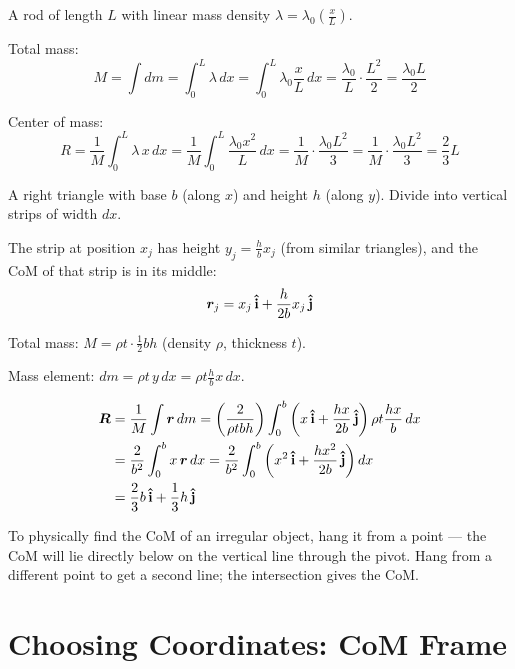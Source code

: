 \begin{example}
A rod of length $L$ with linear mass density $\lambda = \lambda_0\!\left(\frac{x}{L}\right)$.

Total mass:
\[
    M = \int dm = \int_0^L \lambda\,dx = \int_0^L \lambda_0\frac{x}{L}\,dx = \frac{\lambda_0}{L}\cdot\frac{L^2}{2} = \frac{\lambda_0 L}{2}
\]

Center of mass:
\[
    R = \frac{1}{M}\int_0^L \lambda\,x\,dx = \frac{1}{M}\int_0^L \frac{\lambda_0 x^2}{L}\,dx = \frac{1}{M}\cdot\frac{\lambda_0 L^2}{3} = \frac{1}{M}\cdot\frac{\lambda_0 L^2}{3} = \frac{2}{3}L
\]
\end{example}

\begin{example}
A right triangle with base $b$ (along $x$) and height $h$ (along $y$). Divide into vertical strips of width $dx$.

The strip at position $x_j$ has height $y_j = \frac{h}{b}x_j$ (from similar triangles), and the CoM of that strip is in its middle:
\[
    \bm{r}_j = x_j\,\boldsymbol{\hat{\textbf{i}}} + \frac{h}{2b}x_j\,\boldsymbol{\hat{\textbf{j}}}
\]

Total mass: $M = \rho t \cdot \frac{1}{2}bh$ (density $\rho$, thickness $t$).

Mass element: $dm = \rho t\,y\,dx = \rho t\frac{h}{b}x\,dx$.

\begin{align*}
    \vect{R} &= \frac{1}{M}\int \lvect{r}\,dm = \left(\frac{2}{\rho t b h}\right)\int_0^b \left(x\,\ihat + \frac{hx}{2b}\,\jhat\right)\rho t\frac{hx}{b}\,dx \\
    &= \frac{2}{b^2}\int_0^b x\,\lvect{r}\,dx = \frac{2}{b^2}\int_0^b \left(x^2\,\ihat + \frac{hx^2}{2b}\,\jhat\right)dx \\
    &= \frac{2}{3}b\,\ihat + \frac{1}{3}h\,\jhat
\end{align*}
\end{example}

\begin{fact}
To physically find the CoM of an irregular object, hang it from a point — the CoM will lie directly below on the vertical line through the pivot. Hang from a different point to get a second line; the intersection gives the CoM.
\end{fact}

\section{Choosing Coordinates: CoM Frame}

